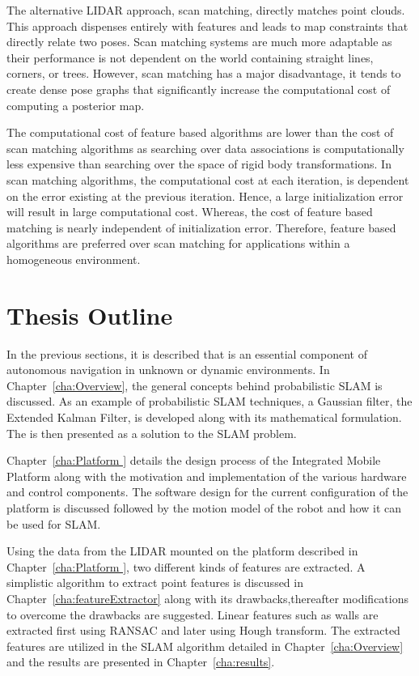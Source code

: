 	The alternative LIDAR approach, scan matching, directly matches point clouds. This approach dispenses entirely with features and leads to map constraints that directly relate two poses. Scan matching systems are much more adaptable as their performance is not dependent on the world containing straight lines, corners, or trees. However, scan matching has a major disadvantage, it tends to create dense pose graphs that significantly increase the computational cost of computing a posterior map. 
	
	The computational cost of feature based algorithms are lower than the cost of scan matching algorithms as searching over data associations is computationally less expensive than searching over the space of rigid body transformations. In scan matching algorithms, the computational cost at each iteration, is dependent on the error existing at the previous iteration. Hence, a large initialization error will result in large computational cost. Whereas, the cost of feature based matching is nearly independent of initialization error. Therefore, feature based algorithms are preferred over scan matching for applications within a homogeneous environment.
	
	\section {Thesis Outline}
	
	In the previous sections, it is  described that \slam  is an essential component of autonomous navigation in unknown or dynamic environments. In Chapter~\ref{cha:Overview}, the general concepts behind probabilistic SLAM is discussed. As an example of probabilistic SLAM techniques, a Gaussian filter, the Extended Kalman Filter, is developed along with its mathematical formulation. The \ekf is then presented as a solution to the SLAM problem. 
	
	Chapter~\ref{cha:Platform } details the design process of the Integrated Mobile Platform along with the motivation and implementation of the various hardware and control components. The software design for the current configuration of the platform is discussed followed by the motion model of the robot and how it can be used for SLAM. 
	
	Using the data from the LIDAR mounted on the platform described in Chapter~\ref{cha:Platform }, two different kinds of features are extracted. A simplistic algorithm to extract point features is discussed in Chapter~\ref{cha:featureExtractor} along with its drawbacks,thereafter modifications to overcome the drawbacks are suggested. Linear features such as walls are extracted first using RANSAC\cite{Fischler1981} and later using Hough transform\cite{Hu1998}. The extracted features are utilized in the SLAM algorithm detailed in Chapter~\ref{cha:Overview} and the results are presented in Chapter~\ref{cha:results}.